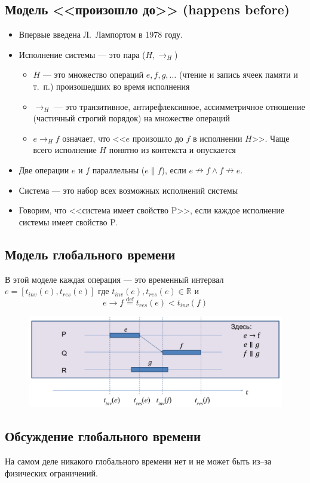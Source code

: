 \documentclass[10pt,a4paper,oneside,titlepage]{article}
\begin{document}
\subsection{Модель <<произошло до>> (happens before)}
\begin{itemize}
	\item Впервые введена Л.~Лампортом в 1978 году.
	\item Исполнение системы --- это пара ($H, \to_H$)
	\begin{itemize}
		\item $H$ --- это множество операций $e, f, g, \ldots$ (чтение и запись ячеек памяти и т.~п.) произошедших во время исполнения
		\item $\to_H$ --- это транзитивное, антирефлексивное, ассимметричное отношение (частичный строгий порядок) на множестве операций
		\item $e\to_Hf$ означает, что <<$e$ произошло до $f$ в исполнении $H$>>. Чаще всего исполнение $H$ понятно из контекста и опускается 
	\end{itemize}
    \item Две операции $e$ и $f$ параллельны ($e\parallel f$), если $e\nrightarrow f\wedge f\nrightarrow e$.
    \item Система --- это набор всех возможных исполнений системы
    \item Говорим, что <<система имеет свойство P>>, если каждое исполнение системы имеет свойство P.
\end{itemize}

\subsection{Модель глобального времени}
В этой моделе каждая операция --- это временный интервал $e=[t_{inv}(e), t_{res}(e)]$ где $t_{inv}(e), t_{res}(e)\in\mathbb{R}$ и
$$
e\to f\stackrel{\mathrm{def}}{=}t_{res}(e)<t_{inv}(f)
$$

\begin{figure}
	\centering
	\includegraphics[width=0.4\linewidth]{pictures/Model3}
	\caption{}
	\label{fig:model3}
\end{figure}

\subsection{Обсуждение глобального времени}
На самом деле никакого глобального времени нет и не может быть из--за физических ограничений.
\end{document}
